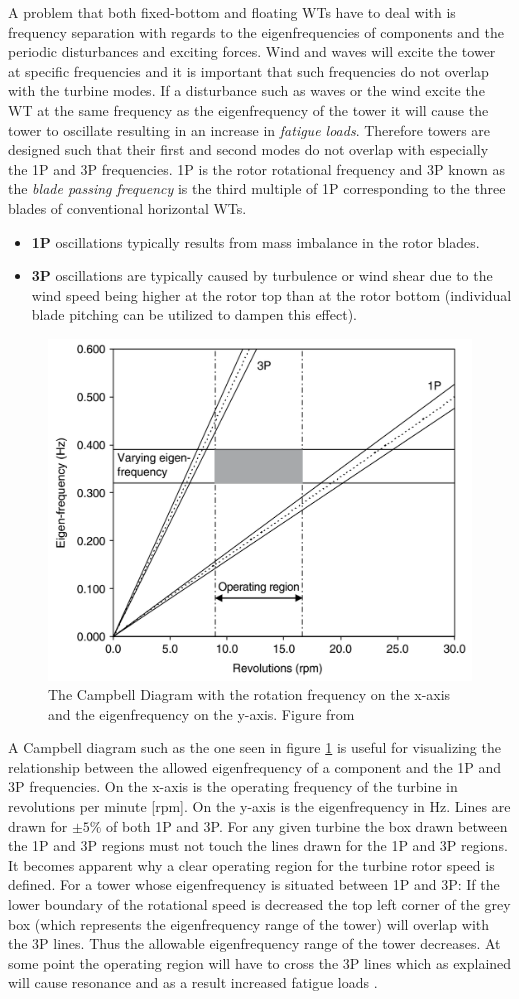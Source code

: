 A problem that both fixed-bottom and floating WTs have to deal with is frequency separation with regards to the eigenfrequencies of components and the periodic disturbances and exciting forces. Wind and waves will excite the tower at specific frequencies and it is important that such frequencies do not overlap with the turbine modes. If a disturbance such as waves or the wind excite the WT at the same frequency as the eigenfrequency of the tower it will cause the tower to oscillate resulting in an increase in \textit{fatigue loads}. Therefore towers are designed such that their first and second modes do not overlap with especially the 1P and 3P frequencies. 1P is the rotor rotational frequency and 3P known as the \textit{blade passing frequency} is the third multiple of 1P corresponding to the three blades of conventional horizontal WTs.
\begin{itemize}
	\item \textbf{1P} oscillations typically results from mass imbalance in the rotor blades.
	\item \textbf{3P} oscillations are typically caused by turbulence or wind shear due to the wind speed being higher at the rotor top than at the rotor bottom (individual blade pitching can be utilized to dampen this effect).
\end{itemize}
\begin{figure}[ht]
	\centering
	\includegraphics[width=0.5\linewidth]{Graphics/CampbellDiagram.PNG}
	\caption{The Campbell Diagram with the rotation frequency on the x-axis and the eigenfrequency on the y-axis. Figure from \cite{Valentine2015}}
	\label{fig:campbell}
\end{figure}
A Campbell diagram such as the one seen in figure \cref{fig:campbell} is useful for visualizing the relationship between the allowed eigenfrequency of a component and the 1P and 3P frequencies. On the x-axis is the operating frequency of the turbine in revolutions per minute [rpm]. On the y-axis is the eigenfrequency in Hz. Lines are drawn for $ \pm 5 \% $ of both 1P and 3P. For any given turbine the box drawn between the 1P and 3P regions must not touch the lines drawn for the 1P and 3P regions. It becomes apparent why a clear operating region for the turbine rotor speed is defined. For a tower whose eigenfrequency is situated between 1P and 3P: If the lower boundary of the rotational speed is decreased the top left corner of the grey box (which represents the eigenfrequency range of the tower) will overlap with the 3P lines. Thus the allowable eigenfrequency range of the tower decreases. At some point the operating region will have to cross the 3P lines which as explained will cause resonance and as a result increased fatigue loads \cite{Valentine2015}.

